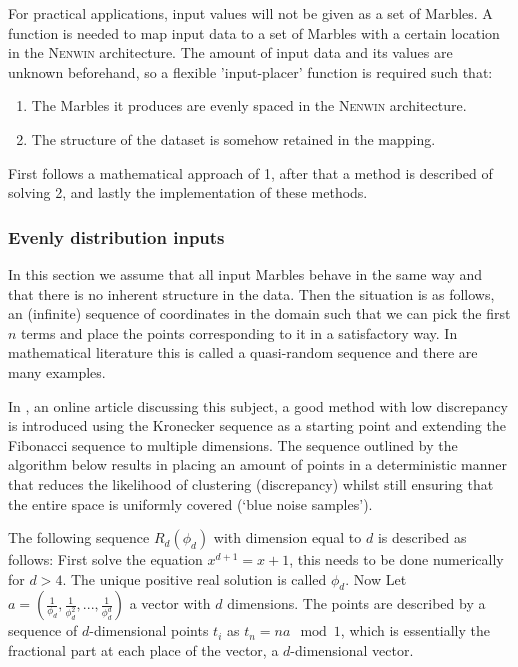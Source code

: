 For practical applications, input values will not be given as a set of Marbles. A function is needed to map input data to a set of Marbles with a certain location in the \textsc{Nenwin} architecture. The amount of input data and its values are unknown beforehand, so a flexible 'input-placer' function is required such that:
\begin{enumerate}
    \item The Marbles it produces are evenly spaced in the \textsc{Nenwin} architecture.
    \item The structure of the dataset is somehow retained in the mapping.
\end{enumerate}
First follows a mathematical approach of 1, after that a method is described of solving 2, and lastly the implementation of these methods.

\subsubsection{Evenly distribution inputs}
In this section we assume that all input Marbles behave in the same way and that there is no inherent structure in the data. Then the situation is as follows, an (infinite) sequence of coordinates in the domain such that we can pick the first $n$ terms and place the points corresponding to it in a satisfactory way. In mathematical literature this is called a quasi-random sequence and there are many examples.

In \cite{rand_sequences}, an online article discussing this subject, a good method with low discrepancy is introduced using the Kronecker sequence as a starting point and extending the Fibonacci sequence to multiple dimensions. The sequence outlined by the algorithm below results in placing an amount of points in a deterministic manner that reduces the likelihood of clustering (discrepancy) whilst still ensuring that the entire space is uniformly covered (‘blue noise samples’).

The following sequence $R_d(\phi_d)$ with dimension equal to $d$ is described as follows:
First solve the equation $x^{d+1} = x + 1$, this needs to be done numerically for $d > 4$. The unique positive real solution is called $\phi_d$. Now Let $a = (\frac{1}{\phi_d}, \frac{1}{\phi_d^2}, ..., \frac{1}{\phi_d^d})$ a vector with $d$ dimensions. The points are described by a sequence  of $d$-dimensional points $t_i$ as $t_n = na \mod 1$, which is essentially the fractional part at each place of the vector, a $d$-dimensional vector.


